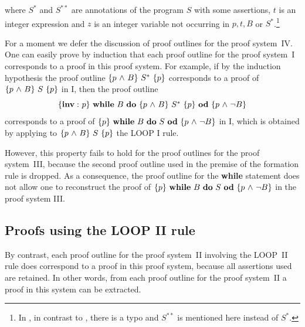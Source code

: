 \documentclass[runningheads]{llncs}       %
\begin{document}
\NI
where $S^*$ and $S^{**}$ are annotations of
the program $S$ with some assertions, 
$t$ is an integer expression and $z$ is an integer variable
not occurring in $p,t,B$ or $S^{*}$.\footnote{In \cite{ABO09}, in contrast to \cite{ABO90},
there is a typo and $S^{**}$ is mentioned here instead of $S^{*}$.}
\III




For a moment we defer the discussion of proof outlines for the proof
system~IV.  One can easily prove by induction that each proof outline
for the proof system~I corresponds to a proof in this proof
system. For example, if by the induction hypothesis the proof outline
$\mbox{$\{{p \mbox{$\ \wedge\ $} B}\}\ {S^*}\ \{{p}\}$}$ corresponds to a proof of $\mbox{$\{{p \mbox{$\ \wedge\ $} B}\}\ {S}\ \{{p}\}$}$ in
I, then the proof outline
\[
  \HT{{\bf inv:}\ p}{\WDD{B}{\HT{p \A B}{S^*}{p}}}{p \A \neg B}
\]
corresponds to a proof of $\mbox{$\{{p}\}\ {\mbox{$\mbox{{\bf while}\ } {B}\ \mbox{{\bf do}\ } {S}\ \mbox{{\bf od}}$}}\ \{{p \mbox{$\ \wedge\ $} \neg B}\}$}$ in I,
which is obtained by applying to $\mbox{$\{{p \mbox{$\ \wedge\ $} B}\}\ {S}\ \{{p}\}$}$ the LOOP I rule.

However, this property fails to hold for the proof outlines for the proof
system~III, because the second proof outline used in the premise of the
formation rule is dropped. As a consequence, the proof outline for the
\textbf{while} statement does not allow one to reconstruct the proof
of $\mbox{$\{{p}\}\ {\mbox{$\mbox{{\bf while}\ } {B}\ \mbox{{\bf do}\ } {S}\ \mbox{{\bf od}}$}}\ \{{p \mbox{$\ \wedge\ $} \neg B}\}$}$ in the proof system III.


\subsection{Proofs using the LOOP II rule}

By contrast, each proof outline for the proof system~II involving the LOOP~II rule
does correspond to a proof in this proof system, because all assertions
used are retained. In other words, from each proof outline for the
proof system~II a proof in this system can be extracted.  
\end{document}
